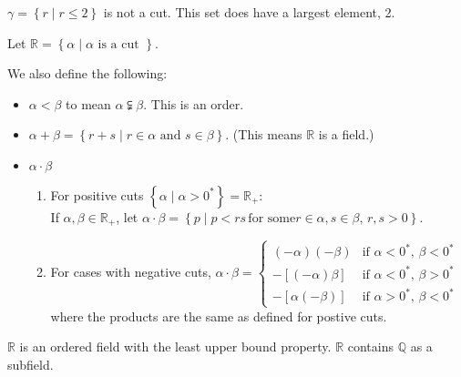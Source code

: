 \documentclass[../main.tex]{subfiles}
\begin{document}
\begin{example}[]
    \( \gamma = \left\{ r \mid r \leq 2 \right\} \) is not a cut.
    This set does have a largest element, 2.
\end{example}

\begin{definition}
    Let \( \mathbb{R} = \left\{ \alpha \mid \alpha \text{ is a cut } \right\}\).
\end{definition}

We also define the following:
\begin{itemize}
    \item \( \alpha < \beta \) to mean \( \alpha \subsetneqq \beta \). This is an order.
    \item \( \alpha + \beta = \left\{ r + s \mid r \in \alpha \text{ and } s \in \beta \right\} \). (This means \( \mathbb{R} \) is a field.)
    \item \( \alpha \cdot \beta \)
    \begin{enumerate}
        \item For positive cuts \( \left\{ \alpha \mid \alpha > 0^* \right\} = \mathbb{R}_+ \): \\
            If \( \alpha, \beta \in \mathbb{R}_+ \), let \( \alpha \cdot \beta = \left\{ p \mid p < rs \, \text{for some} r \in \alpha, s \in \beta, \, r,s>0\right\} \).
        \item For cases with negative cuts, \( \alpha \cdot \beta =
        \begin{cases}
            (-\alpha)(-\beta) & \text{if } \alpha < 0^*, \, \beta < 0^* \\
            -[(-\alpha)\beta] & \text{if } \alpha < 0^*, \, \beta > 0^* \\
            -[\alpha(-\beta)] & \text{if } \alpha > 0^*, \, \beta < 0^*
        \end{cases} \) \\
        where the products are the same as defined for postive cuts.
    \end{enumerate}
\end{itemize}

\begin{theorem}[]
    \( \mathbb{R} \) is an ordered field with the least upper bound property.
    \( \mathbb{R} \) contains \( \mathbb{Q} \) as a subfield.
\end{theorem}

\end{document}
